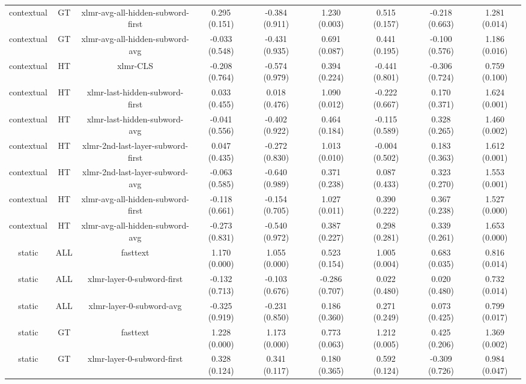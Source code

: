 \begin{sidewaystable}[htb]
\begin{tabular}{@{}ccccccccc@{}}
        contextual & GT & xlmr-avg-all-hidden-subword-first & 0.295 (0.151) & -0.384 (0.911) & 1.230 (0.003) & 0.515 (0.157) & -0.218 (0.663) & 1.281 (0.014) \\
        contextual & GT & xlmr-avg-all-hidden-subword-avg & -0.033 (0.548) & -0.431 (0.935) & 0.691 (0.087) & 0.441 (0.195) & -0.100 (0.576) & 1.186 (0.016) \\
        contextual & HT & xlmr-CLS & -0.208 (0.764) & -0.574 (0.979) & 0.394 (0.224) & -0.441 (0.801) & -0.306 (0.724) & 0.759 (0.100) \\
        contextual & HT & xlmr-last-hidden-subword-first & 0.033 (0.455) & 0.018 (0.476) & 1.090 (0.012) & -0.222 (0.667) & 0.170 (0.371) & 1.624 (0.001) \\
        contextual & HT & xlmr-last-hidden-subword-avg & -0.041 (0.556) & -0.402 (0.922) & 0.464 (0.184) & -0.115 (0.589) & 0.328 (0.265) & 1.460 (0.002) \\
        contextual & HT & xlmr-2nd-last-layer-subword-first & 0.047 (0.435) & -0.272 (0.830) & 1.013 (0.010) & -0.004 (0.502) & 0.183 (0.363) & 1.612 (0.001) \\
        contextual & HT & xlmr-2nd-last-layer-subword-avg & -0.063 (0.585) & -0.640 (0.989) & 0.371 (0.238) & 0.087 (0.433) & 0.323 (0.270) & 1.553 (0.001) \\
        contextual & HT & xlmr-avg-all-hidden-subword-first & -0.118 (0.661) & -0.154 (0.705) & 1.027 (0.011) & 0.390 (0.222) & 0.367 (0.238) & 1.527 (0.000) \\
        contextual & HT & xlmr-avg-all-hidden-subword-avg & -0.273 (0.831) & -0.540 (0.972) & 0.387 (0.227) & 0.298 (0.281) & 0.339 (0.261) & 1.653 (0.000) \\
        static & ALL & fasttext & 1.170 (0.000) & 1.055 (0.000) & 0.523 (0.154) & 1.005 (0.004) & 0.683 (0.035) & 0.816 (0.014) \\
        static & ALL & xlmr-layer-0-subword-first & -0.132 (0.713) & -0.103 (0.676) & -0.286 (0.707) & 0.022 (0.480) & 0.020 (0.480) & 0.732 (0.014) \\
        static & ALL & xlmr-layer-0-subword-avg & -0.325 (0.919) & -0.231 (0.850) & 0.186 (0.360) & 0.271 (0.249) & 0.073 (0.425) & 0.799 (0.017) \\
        static & GT & fasttext & 1.228 (0.000) & 1.173 (0.000) & 0.773 (0.063) & 1.212 (0.005) & 0.425 (0.206) & 1.369 (0.002) \\
        static & GT & xlmr-layer-0-subword-first & 0.328 (0.124) & 0.341 (0.117) & 0.180 (0.365) & 0.592 (0.124) & -0.309 (0.726) & 0.984 (0.047) \\

\end{tabular}
\end{sidewaystable}

